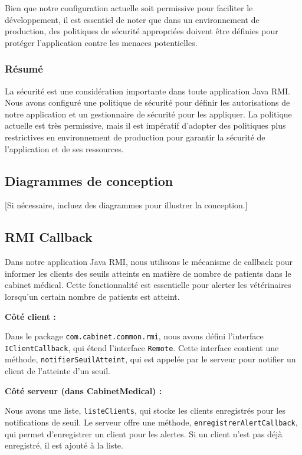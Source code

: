 \documentclass{article} %
\begin{document}
Bien que notre configuration actuelle soit permissive pour faciliter le développement, il est essentiel de noter que dans un environnement de production, des politiques de sécurité appropriées doivent être définies pour protéger l'application contre les menaces potentielles.

\subsubsection{Résumé}

La sécurité est une considération importante dans toute application Java RMI. Nous avons configuré une politique de sécurité pour définir les autorisations de notre application et un gestionnaire de sécurité pour les appliquer. La politique actuelle est très permissive, mais il est impératif d'adopter des politiques plus restrictives en environnement de production pour garantir la sécurité de l'application et de ses ressources.

\subsection{Diagrammes de conception}
[Si nécessaire, incluez des diagrammes pour illustrer la conception.]

\subsection{RMI Callback}

Dans notre application Java RMI, nous utilisons le mécanisme de callback pour informer les clients des seuils atteints en matière de nombre de patients dans le cabinet médical. Cette fonctionnalité est essentielle pour alerter les vétérinaires lorsqu'un certain nombre de patients est atteint.

\bigskip
\textbf{Côté client :}

Dans le package \texttt{com.cabinet.common.rmi}, nous avons défini l'interface \texttt{IClientCallback}, qui étend l'interface \texttt{Remote}. Cette interface contient une méthode, \texttt{notifierSeuilAtteint}, qui est appelée par le serveur pour notifier un client de l'atteinte d'un seuil.

\bigskip
\textbf{Côté serveur (dans CabinetMedical) :}

\begin{sloppypar}
    Nous avons une liste, \texttt{listeClients}, qui stocke les clients enregistrés pour les notifications de seuil. Le serveur offre une méthode, \texttt{enregistrerAlertCallback}, qui permet d'enregistrer un client pour les alertes. Si un client n'est pas déjà enregistré, il est ajouté à la liste.
\end{sloppypar}
\end{document}
